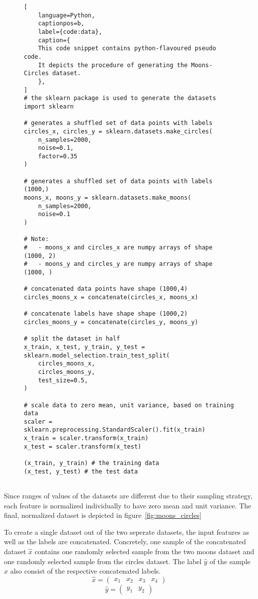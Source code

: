\begin{figure}[ht]
\centering
\begin{minipage}{\linewidth}
\begin{lstlisting}[
    language=Python,
    captionpos=b, 
    label={code:data},
    caption={
    This code snippet contains python-flavoured pseudo code.
    It depicts the procedure of generating the Moons-Circles dataset.
    },
]
# the sklearn package is used to generate the datasets
import sklearn 

# generates a shuffled set of data points with labels
circles_x, circles_y = sklearn.datasets.make_circles(
    n_samples=2000, 
    noise=0.1, 
    factor=0.35
)

# generates a shuffled set of data points with labels (1000,)
moons_x, moons_y = sklearn.datasets.make_moons(
    n_samples=2000, 
    noise=0.1
)

# Note: 
#   - moons_x and circles_x are numpy arrays of shape (1000, 2) 
#   - moons_y and circles_y are numpy arrays of shape (1000, ) 

# concatenated data points have shape (1000,4)
circles_moons_x = concatenate(circles_x, moons_x)

# concatenate labels have shape shape (1000,2)
circles_moons_y = concatenate(circles_y, moons_y)

# split the dataset in half
x_train, x_test, y_train, y_test = sklearn.model_selection.train_test_split(
    circles_moons_x, 
    circles_moons_y, 
    test_size=0.5, 
)

# scale data to zero mean, unit variance, based on training data
scaler = sklearn.preprocessing.StandardScaler().fit(x_train)
x_train = scaler.transform(x_train)
x_test = scaler.transform(x_test)

(x_train, y_train) # the training data
(x_test, y_test) # the test data


\end{lstlisting}
\end{minipage}
\end{figure}

Since ranges of values of the datasets are different due to their sampling strategy, each feature is normalized individually to have zero mean and unit variance.
The final, normalized dataset is depicted in figure~\ref{fig:moons_circles}

To create a single dataset out of the two seperate datasets, the input features as well as the labels are concatenated.
Concretely, one sample of the concatenated dataset $\hat x$ contains one randomly selected sample from the two moons dataset and one randomly selected sample from the circles dataset.
The label $\hat y$ of the sample $\hat x$ also consist of the respective concatenated labels.
$$\hat x = \begin{pmatrix} x_1 & x_2 & x_3 & x_4 \end{pmatrix}$$
$$\hat y = \begin{pmatrix} y_1 & y_2 \end{pmatrix}$$

